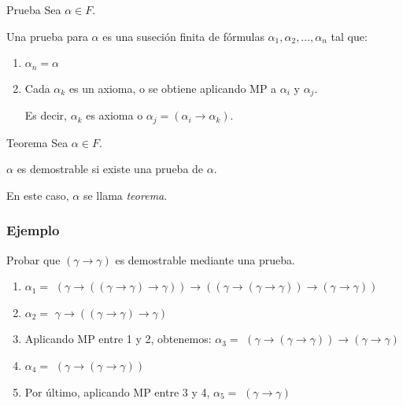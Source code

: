 \medskip

\begin{definicion}{Prueba}{}
    Sea $\alpha \in F$.

    \medskip

    Una prueba para $\alpha$ es una suseción finita de fórmulas 
    $\alpha_1, \alpha_2, \dotsc, \alpha_n$ tal que:
    \begin{enumerate}
        \item $\alpha_n = \alpha$
        \item Cada $\alpha_k$ es un axioma, o se obtiene aplicando MP a 
            $\alpha_i$ y $\alpha_j$.

            Es decir, $\alpha_k$ es axioma o $\alpha_j = (\alpha_i \to \alpha_k)$.

    \end{enumerate}
\end{definicion}

\medskip

\begin{definicion}{Teorema}{}
    Sea $\alpha \in F$.

    \medskip

    $\alpha$ es demostrable si existe una prueba de $\alpha$.

    \bigskip
    En este caso, $\alpha$ se llama \textit{teorema}.
\end{definicion}

\subsubsection{Ejemplo}

Probar que $(\gamma \to \gamma)$ es demostrable mediante una prueba.

\begin{enumerate}
    \item $\alpha_1=$ $(\gamma \to ((\gamma \to \gamma) \to \gamma )) 
        \to 
        ((\gamma \to (\gamma \to \gamma))\to (\gamma \to \gamma))$

    \item $\alpha_2=$ $\gamma \to ( (\gamma \to \gamma) \to \gamma)$

    \item Aplicando MP entre 1 y 2, obtenemos:
        $\alpha_3=$ $(\gamma \to (\gamma \to \gamma)) \to (\gamma \to \gamma)$

    \item $\alpha_4=$ $(\gamma \to (\gamma \to \gamma))$

    \item Por último, aplicando MP entre 3 y 4, 
        $\alpha_5=$ $(\gamma \to \gamma)$
\end{enumerate}

